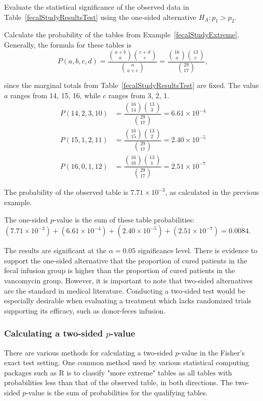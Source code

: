 \begin{example}{Evaluate the statistical significance of the observed data in Table~\ref{fecalStudyResultsTest} using the one-sided alternative $H_A: p_1 > p_2$.}

Calculate the probability of the tables from Example~\ref{fecalStudyExtreme}. Generally, the formula for these tables is 
\[P(a, b, c, d) = \dfrac{ {a+b \choose a} {c+d \choose c}}{{n \choose a+c}} = \dfrac{ {16 \choose a} {13 \choose c}}{{29 \choose 17}},\] 

since the marginal totals from Table~\ref{fecalStudyResultsTest} are fixed. The value $a$ ranges from 14, 15, 16, while $c$ ranges from 3, 2, 1.
\begin{align*}
P(14, 2, 3, 10) &= \dfrac{ {16 \choose 14} {13 \choose 3}}{{29 \choose 17}} = 6.61 \times 10^{-4} \\
P(15, 1, 2, 11) &= \dfrac{ {16 \choose 15} {13 \choose 2}}{{29 \choose 17}} = 2.40 \times 10^{-5} \\
P(16, 0, 1, 12) &= \dfrac{ {16 \choose 16} {13 \choose 1}}{{29 \choose 17}} = 2.51 \times 10^{-7}
\end{align*}

The probability of the observed table is $7.71 \times 10^{-3}$, as calculated in the previous example.

The one-sided $p$-value is the sum of these table probabilities: $(7.71 \times 10^{-3}) + (6.61 \times 10^{-4}) + (2.40 \times 10^{-5}) + (2.51 \times 10^{-7}) = 0.0084.$

The results are significant at the $\alpha = 0.05$ significance level. There is evidence to support the one-sided alternative that the proportion of cured patients in the fecal infusion group is higher than the proportion of cured patients in the vancomycin group. However, it is important to note that two-sided alternatives are the standard in medical literature. Conducting a two-sided test would be especially desirable when evaluating a treatment which lacks randomized trials supporting its efficacy, such as donor-feces infusion.
\end{example}

\subsubsection{Calculating a two-sided $p$-value}

There are various methods for calculating a two-sided $p$-value in the Fisher's exact test setting. One common method used by various statistical computing packages such as \textsf{R} is to classify "more extreme" tables as all tables with probabilities less than that of the observed table, in both directions. The two-sided $p$-value is the sum of probabilities for the qualifying tables.


